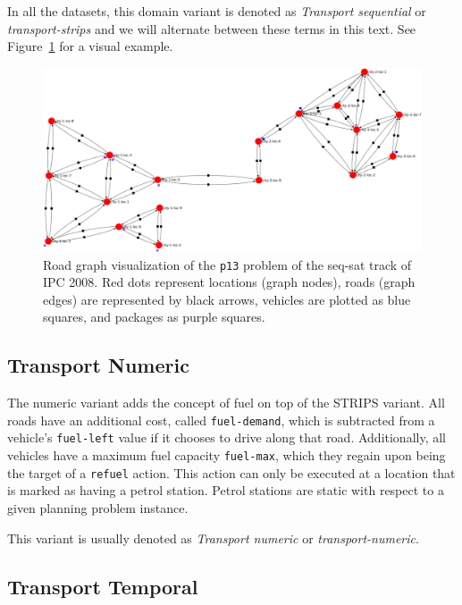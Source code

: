 In all the datasets, this domain variant is denoted as \textit{Transport sequential}
or \textit{transport-strips} and we will alternate between these terms in this text. See Figure~\ref{fig:ipc08_seq-sat_p13} for a visual example.

\begin{figure}[tbp]
\begin{center}
\includegraphics[width=1.0\textwidth]{../img/ipc08_seq-sat_p13_land2}
\end{center}
\caption[Visualization of the \texttt{p13} problem of sequential Transport from IPC 2008.]{Road graph visualization of the \texttt{p13} problem of the seq-sat track of IPC 2008. Red dots represent locations (graph nodes), roads (graph edges) are represented by black arrows, vehicles are plotted as blue squares, and packages as purple squares.}
\label{fig:ipc08_seq-sat_p13}
\end{figure}

\subsection{Transport Numeric}\label{transport-numeric}

The numeric variant adds the concept of fuel on top of the STRIPS variant.
All roads have an additional cost, called \verb+fuel-demand+, which is
subtracted from a vehicle's \verb+fuel-left+ value if it chooses to drive along that road.
Additionally, all vehicles have a maximum fuel capacity \verb+fuel-max+,
which they regain upon being the target of a \verb+refuel+ action. This action can only
be executed at a location that is marked as having a petrol station. Petrol stations
are static with respect to a given planning problem instance.

This variant is usually denoted as \textit{Transport numeric} or \textit{transport-numeric}.

\subsection{Transport Temporal}\label{transport-temporal}

